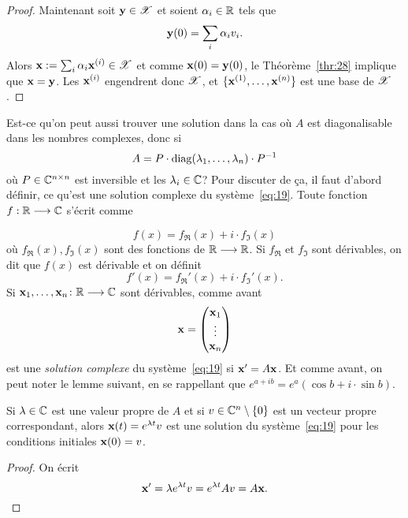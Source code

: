 {\begin{proof}
Maintenant soit $\mathbf{y} \in \mathscr{X}$ et soient  $\alpha_i \in \mathbb{R}$  tels que 
\begin{displaymath}
  \mathbf{y}(0) = \sum_i \alpha_i v_i.  
\end{displaymath}
Alors $\mathbf{x} := \sum_i \alpha_i \mathbf{x}^{(i)} \in \mathscr{X}$  et comme $\mathbf{x}(0) = \mathbf{y}(0)$, le Théorème~\ref{thr:28} implique que $\mathbf{x} = \mathbf{y}$. Les $\mathbf{x}^{(i)}$ engendrent donc $\mathscr{X}$, et $\{\mathbf{x}^{(1)},\dots, \mathbf{x}^{(n)}\}$ est une base de $\mathscr{X}$. 
\end{proof}


Est-ce qu'on peut aussi trouver une solution dans la cas où $A$ est diagonalisable dans les nombres complexes, donc si 
\begin{displaymath}
A=P \cdot \operatorname{diag}(\lambda_1,\dots,\lambda_n) \cdot P^{-1} 
\end{displaymath}
où $P \in \mathbb{C}^{n \times n}$ est inversible et les  $\lambda_i \in \mathbb{C}$? Pour discuter de ça, il faut d'abord définir, ce qu'est une solution complexe du système~\eqref{eq:19}. Toute fonction $f: \mathbb{R} \longrightarrow \mathbb{C}$ s'écrit comme 

\begin{displaymath}
  f(x) = f_{\Re}(x) + i \cdot f_{\Im}(x) 
\end{displaymath}
où $f_{\Re}(x), f_{\Im}(x)$ sont des fonctions de $ \mathbb{R} \longrightarrow \mathbb{R}$.  Si $f_\Re$ et $f_\Im$ sont dérivables, on dit que $f(x)$ est dérivable et on définit 
\begin{displaymath}
  f'(x) = f_\Re'(x) + i \cdot f_\Im'(x). 
\end{displaymath}
Si $\mathbf{x}_1,\dots,\mathbf{x}_n\colon \mathbb{R} \longrightarrow \mathbb{C}$ sont dérivables, comme avant 
\begin{displaymath}
  \mathbf{x} =
  \begin{pmatrix}
    \mathbf{x}_1\\ \vdots \\ \mathbf{x}_n
  \end{pmatrix}
\end{displaymath}
est une \emph{solution complexe} du système~\eqref{eq:19} si $\mathbf{x}' = A\mathbf{x}$.   Et comme avant, on peut noter le lemme suivant, en se rappellant que $e^{a + ib} = e^a (\cos b + i \cdot \sin b)$. 


\begin{lemma}
  \label{lem:15}
  Si $\lambda \in \mathbb{C}$ est une valeur propre de $A$ et si $v \in \mathbb{C}^n \setminus \{0\}$ est un vecteur propre correspondant, alors $\mathbf{x}(t) = e^{\lambda t} v$ est  une solution du système~\eqref{eq:19} pour les conditions initiales $\mathbf{x}(0) = v$. 
\end{lemma}
\begin{proof}
  On écrit 
  \begin{displaymath}
    \mathbf{x}' = \lambda e^{\lambda t} v = e^{\lambda t} Av = A\mathbf{x}.
  \end{displaymath}
\end{proof}


}
